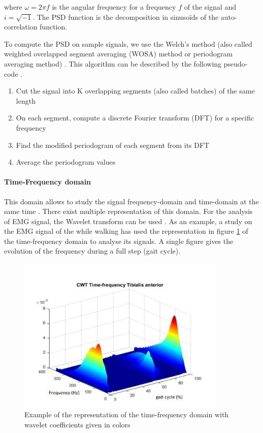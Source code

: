 \documentclass{article}
\begin{document}
where $\omega = 2 \pi f$ is the angular frequency for a frequency $f$ of the signal and $i=\sqrt{-1}$. The PSD function is the decomposition in sinusoïds of the auto-correlation function.

To compute the PSD on sample signals, we use the Welch's method (also called weighted overlapped segment averaging (WOSA) method or periodogram averaging method) \cite{ref:psd1, ref:psd2}. This algorithm can be described by the following pseudo-code \cite{ref:psd2}.
\begin{enumerate}
    \item Cut the signal into K overlapping segments (also called batches) of the same length
    \item On each segment, compute a discrete Fourier transform (DFT) for a specific frequency
    \item Find the modified periodogram of each segment from its DFT
    \item Average the periodogram values
\end{enumerate}

\paragraph{Time-Frequency domain}

This domain allows to study the signal frequency-domain and time-domain at the same time \cite{ref:wikiTimeFreqDomain}. There exist multiple representation of this domain. For the analysis of EMG signal, the Wavelet transform can be used \cite{ref:timeFreqDomain}. As an example, a study \cite{ref:timeFreqDomain} on the EMG signal of the while walking has used the representation in figure \ref{fig:timeFreqDomain} of the time-frequency domain to analyse its signals. A single figure gives the evolution of the frequency during a full step (gait cycle).

\begin{figure}[H]
    \centering
    \includegraphics[width=10cm]{images/timeFreqDomainExample.png}
    \caption{Example of the representation of the time-frequency domain with wavelet coefficients given in colors \cite{ref:timeFreqDomain}}
    \label{fig:timeFreqDomain}
\end{figure}
\end{document}
